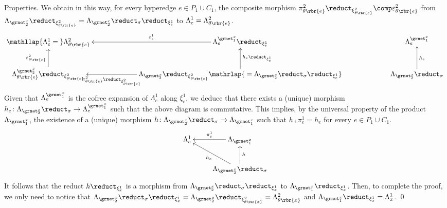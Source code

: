 \documentclass{LMCS}
\begin{document}
\begin{minisection}{Properties.}
    We obtain in this way, for every hyperedge \(e \in P_{1} \cup C_{1}\), the composite morphism \(\pi^{2}_{\theta\rbr{e}} \reduct_{\xi^{2}_{\theta\rbr{e}}} \comp \varepsilon^{2}_{\theta\rbr{e}}\) from \(\Lambda_{\grnet_{2}^{x}} \reduct_{\xi^{2}_{\theta\rbr{e}}} = \Lambda_{\grnet_{2}^{x}} \reduct_{\sigma} \reduct_{\xi^{1}_{e}}\) to \(\Lambda^{1}_{e} = \Lambda^{2}_{\theta\rbr{e}}\).
    \[
    \xymatrix @C+4em {
      {\mathllap{\Lambda^{1}_{e} = {}}\Lambda^{2}_{\theta\rbr{e}}}
      & {\Lambda^{\grnet_{1}^{x}}_{e} \reduct_{\xi^{1}_{e}}}
      \ar [l] _-{\varepsilon^{1}_{e}}
      & {\Lambda^{\grnet_{1}^{x}}_{e}}
      \\
      {\Lambda^{\grnet_{2}^{x}}_{\theta\rbr{e}} \reduct_{\xi^{2}_{\theta\rbr{e}}}}
      \ar [u] ^{\varepsilon^{2}_{\theta\rbr{e}}} 
      & {\Lambda_{\grnet_{2}^{x}} \reduct_{\xi^{2}_{\theta\rbr{e}}}\mathrlap{{} = \Lambda_{\grnet_{2}^{x}} \reduct_{\sigma} \reduct_{\xi^{1}_{e}}}}
      \ar [u] _{h_{e} \reduct_{\xi^{1}_{e}}}
      \ar [l] ^-{\pi^{2}_{\theta\rbr{e}} \reduct_{\xi^{2}_{\theta\rbr{e}}}}
      & {\Lambda_{\grnet_{2}^{x}} \reduct_{\sigma}}
      \ar [u] _{h_{e}}
    }
    \]
    Given that \(\Lambda^{\grnet_{1}^{x}}_{e}\) is the cofree expansion of \(\Lambda^{1}_{e}\) along \(\xi^{1}_{e}\), we deduce that there exists a (unique) morphism \(h_{e} \colon \Lambda_{\grnet_{2}^{x}} \reduct_{\sigma} \to \Lambda^{\grnet_{1}^{x}}_{e}\) such that the above diagram is commutative.
    This implies, by the universal property of the product \(\Lambda_{\grnet_{1}^{x}}\), the existence of a (unique) morphism \(h \colon \Lambda_{\grnet_{2}^{x}} \reduct_{\sigma} \to \Lambda_{\grnet_{1}^{x}}\) such that \(h \comp \pi^{1}_{e} = h_{e}\) for every \(e \in P_{1} \cup C_{1}\).
    \[
    \xymatrix {
      {\Lambda^{1}_{e}}
      & {\Lambda_{\grnet_{1}^{x}}}
      \ar [l] _-{\pi^{1}_{e}}
      \\
      & 
      {\Lambda_{\grnet_{2}^{x}} \reduct_{\sigma}}
      \ar [u] _{h}
      \ar [ul] ^-{h_{e}}
    }
    \]
    It follows that the reduct \(h \reduct_{\xi^{1}_{x}}\) is a morphism from \(\Lambda_{\grnet_{2}^{x}} \reduct_{\sigma} \reduct_{\xi^{1}_{x}}\) to \(\Lambda_{\grnet_{1}^{x}} \reduct_{\xi^{1}_{x}}\).  Then, to complete the proof, we only need to notice that \(\Lambda_{\grnet_{2}^{x}} \reduct_{\sigma} \reduct_{\xi^{1}_{x}} = \Lambda_{\grnet_{2}^{x}} \reduct_{\xi^{2}_{\theta\rbr{x}}} = \Lambda^{2}_{\theta\rbr{x}}\) and \(\Lambda_{\grnet_{1}^{x}} \reduct_{\xi^{1}_{x}} = \Lambda^{1}_{x}\).
    \qed
\end{minisection}
\end{document}
